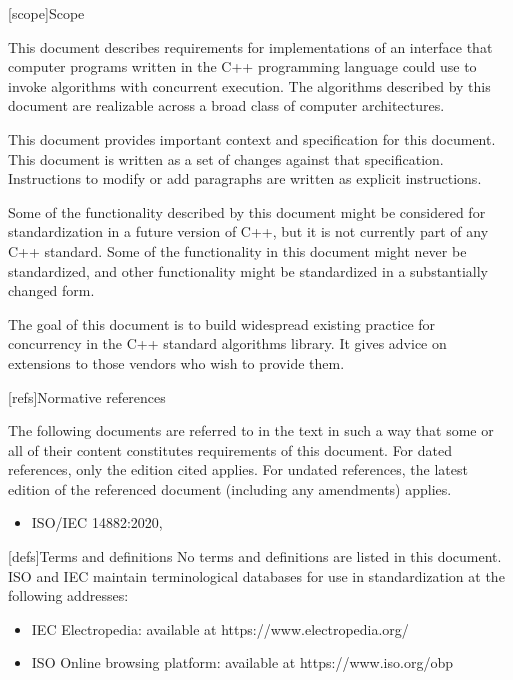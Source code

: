 
[scope]{Scope}

This document describes requirements for implementations of an interface that computer programs written in the C++ programming language could use to invoke algorithms with concurrent execution. The algorithms described by this document are realizable across a broad class of computer architectures.

This document provides important context and specification for
this document. This document is written as a set of changes against that specification.  Instructions to modify or add paragraphs are written as
explicit instructions.

Some of the functionality described by this document might be considered for standardization in a future version of C++, but it is not currently part of any C++ standard. Some of the functionality in this document might never be standardized, and other functionality might be standardized in a substantially changed form.

The goal of this document is to build widespread existing practice for concurrency in the C++ standard algorithms library. It gives advice on extensions to those vendors who wish to provide them.

[refs]{Normative references}

The following documents are referred to in the text in such a way that some or all of their content constitutes requirements of this document. For dated references, only the edition cited applies. For undated references, the latest edition of the referenced document (including any amendments) applies.

\begin{itemize}
\item ISO/IEC 14882:2020, 
\end{itemize}



[defs]{Terms and definitions}
{}%
No terms and definitions are listed in this document. ISO and IEC maintain
terminological databases for use in standardization at the following addresses:

\begin{itemize}
    \item IEC Electropedia: available at https://www.electropedia.org/
    \item ISO Online browsing platform: available at https://www.iso.org/obp
\end{itemize}

